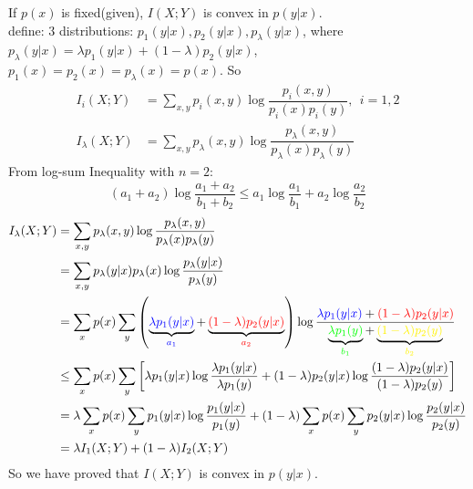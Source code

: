 If $p(x)$ is fixed(given), $I(X;Y)$ is convex in $p(y|x)$. \\
define: $3$ distributions: $p_1(y|x), p_2(y|x), p_{\lambda}(y|x)$, where \\
$p_{\lambda}(y|x)=\lambda p_1(y|x)+(1-\lambda)p_2(y|x)$, $p_1(x)=p_2(x)=p_{\lambda}(x)=p(x)$.
So
\begin{align*}
I_i(X;Y) &= \sum_{x,y}p_i(x,y)\log\dfrac{p_i(x,y)}{p_i(x)p_i(y)},\ \  i=1,2 \\
I_{\lambda}(X;Y) &= \sum_{x,y}p_{\lambda}(x,y)\log\dfrac{p_{\lambda}(x,y)}{p_{\lambda}(x)p_{\lambda}(y)}
\end{align*}
From log-sum Inequality with $n=2$:
$$(a_1+a_2)\log\dfrac{a_1+a_2}{b_1+b_2}\leq a_1\log\dfrac{a_1}{b_1}+a_2\log\dfrac{a_2}{b_2}$$
\begin{align*}
I_{\lambda}(X;Y) &= \sum_{x,y}p_{\lambda}(x,y)\log\dfrac{p_{\lambda}(x,y)}{p_{\lambda}(x)p_{\lambda}(y)} \\
&= \sum_{x,y}p_{\lambda}(y|x)p_{\lambda}(x)\log\dfrac{p_{\lambda}(y|x)}{p_{\lambda}(y)} \\
&= \sum_{x}p(x)\sum_y\left(\underbrace{\textcolor{blue}{\lambda p_1(y|x)}}_{\textcolor{blue}{a_1}}+\underbrace{\textcolor{red}{(1-\lambda)p_2(y|x)}}_{\textcolor{red}{a_2}}\right)\log\dfrac{\textcolor{blue}{\lambda p_1(y|x)}+\textcolor{red}{(1-\lambda)p_2(y|x)}}{\underbrace{\textcolor{green}{\lambda p_1(y)}}_{\textcolor{green}{b_1}}+\underbrace{\textcolor{yellow}{(1-\lambda)p_2(y)}}_{\textcolor{yellow}{b_2}}} \\
&\leq \sum_{x}p(x)\sum_y\left[\lambda p_1(y|x)\log\dfrac{\lambda p_1(y|x)}{\lambda p_1(y)}+(1-\lambda)p_2(y|x)\log\dfrac{(1-\lambda)p_2(y|x)}{(1-\lambda)p_2(y)}\right] \\
&= \lambda\sum_{x}p(x)\sum_y p_1(y|x)\log\dfrac{p_1(y|x)}{p_1(y)} + (1-\lambda)\sum_{x}p(x)\sum_y p_2(y|x)\log\dfrac{p_2(y|x)}{p_2(y)} \\
&= \lambda I_1(X;Y) + (1-\lambda)I_2(X;Y)
\end{align*}
So we have proved that $I(X;Y)$ is convex in $p(y|x)$.\\

\newpage